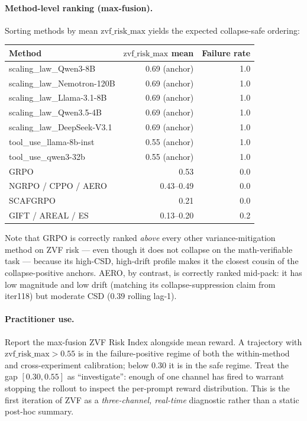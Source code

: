 \documentclass{article}
\begin{document}
\paragraph{Method-level ranking (max-fusion).} Sorting methods by mean
$\mathrm{zvf\_risk\_max}$ yields the expected collapse-safe ordering:
\begin{center}
\small
\begin{tabular}{lrr}
\hline
Method & $\mathrm{zvf\_risk\_max}$ mean & Failure rate \\
\hline
scaling\_law\_Qwen3-8B        & 0.69 (anchor) & 1.0 \\
scaling\_law\_Nemotron-120B   & 0.69 (anchor) & 1.0 \\
scaling\_law\_Llama-3.1-8B    & 0.69 (anchor) & 1.0 \\
scaling\_law\_Qwen3.5-4B      & 0.69 (anchor) & 1.0 \\
scaling\_law\_DeepSeek-V3.1   & 0.69 (anchor) & 1.0 \\
tool\_use\_llama-8b-inst      & 0.55 (anchor) & 1.0 \\
tool\_use\_qwen3-32b          & 0.55 (anchor) & 1.0 \\
GRPO                          & 0.53          & 0.0 \\
NGRPO / CPPO / AERO           & 0.43--0.49    & 0.0 \\
SCAFGRPO                      & 0.21          & 0.0 \\
GIFT / AREAL / ES             & 0.13--0.20    & 0.2 \\
\hline
\end{tabular}
\end{center}
Note that GRPO is correctly ranked \emph{above} every other
variance-mitigation method on ZVF risk --- even though it does not
collapse on the math-verifiable task --- because its high-CSD,
high-drift profile makes it the closest cousin of the
collapse-positive anchors. AERO, by contrast, is correctly ranked
mid-pack: it has low magnitude and low drift (matching its
collapse-suppression claim from iter118) but moderate CSD ($0.39$
rolling lag-1).

\paragraph{Practitioner use.} Report the max-fusion ZVF Risk Index
alongside mean reward. A trajectory with
$\mathrm{zvf\_risk\_max} > 0.55$ is in the failure-positive regime of
both the within-method and cross-experiment calibration; below
$0.30$ it is in the safe regime. Treat the gap $[0.30, 0.55]$ as
``investigate'': enough of one channel has fired to warrant stopping
the rollout to inspect the per-prompt reward distribution. This is the
first iteration of ZVF as a \emph{three-channel, real-time} diagnostic
rather than a static post-hoc summary.
\end{document}
